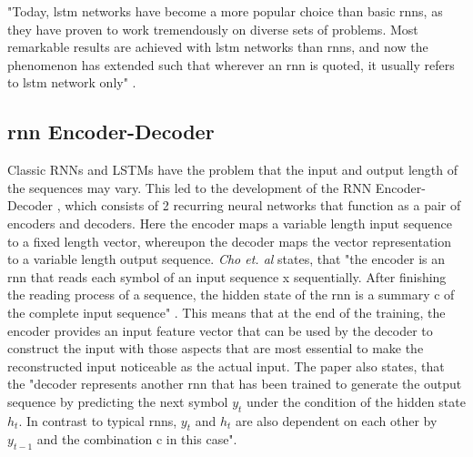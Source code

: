 \documentclass[a4paper, 11pt,titlepage,oneside,openany]{book}
\begin{document}
\noindent "Today, \gls{lstm} networks have become a more popular choice than basic \gls{rnn}s, as they have proven to work tremendously on diverse sets of problems. Most remarkable results are achieved with \gls{lstm} networks than \gls{rnn}s, and now the phenomenon has extended such that wherever an \gls{rnn} is quoted, it usually refers to \gls{lstm} network only" \cite{rnn}.

\subsection{\gls{rnn} Encoder-Decoder}
Classic RNNs and LSTMs have the problem that the input and output length of the sequences may vary. This led to the development of the RNN Encoder-Decoder \cite{encodedecode}, which consists of 2 recurring neural networks that function as a pair of encoders and decoders. Here the encoder maps a variable length input sequence to a fixed length vector, whereupon the decoder maps the vector representation to a variable length output sequence. \textit{Cho et. al} states, that "the encoder is an \gls{rnn} that reads each symbol of an input sequence x sequentially. After finishing the reading process of a sequence, the hidden state of the \gls{rnn} is a summary c of the complete input sequence" \cite{encodedecode}. This means that at the end of the training, the encoder provides an input feature vector that can be used by the decoder to construct the input with those aspects that are most essential to make the reconstructed input noticeable as the actual input. The paper also states, that the "decoder represents another \gls{rnn} that has been trained to generate the output sequence by predicting the next symbol $y_t$ under the condition of the hidden state $h_t$. In contrast to typical \gls{rnn}s, $y_t$ and $h_t$ are also dependent on each other by $y_{t-1}$ and the combination c in this case".
\end{document}
